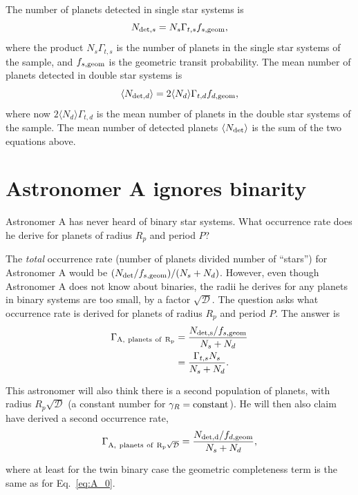 \documentclass{emulateapj}
\begin{document}
The number of planets detected in single star systems is
\begin{equation}
N_{{\rm det},s} = N_s \Gamma_{t,s} f_{s,{\rm geom}},
\label{eq:N_det_s}
\end{equation}
where the product $N_s \Gamma_{t,s}$ is the number of planets in the single 
star systems of the sample, and $f_{s,{\rm geom}}$ is the geometric transit 
probability.
The mean number of planets detected in double star systems is
\begin{equation}
\langle N_{{\rm det},d}\rangle = 2 \langle N_d\rangle  \Gamma_{t,d} f_{d,{\rm geom}},
\label{eq:N_det_d}
\end{equation}
where now $2 \langle N_d\rangle  \Gamma_{t,d}$ is the mean number of planets in
the double star systems of the sample.
The mean number of detected planets $\langle N_{\rm det} \rangle$ is the sum of
the two equations above.


\section{Astronomer A ignores binarity}
Astronomer A has never heard of binary star systems. What occurrence rate does 
he derive for planets of radius $R_p$ and period $P$?

The {\it total} occurrence rate (number of planets divided number of 
``stars'') for Astronomer A would be $(N_{\rm det}/f_{s,{\rm geom}})/(N_s + 
N_d)$. However, even though Astronomer A does not know about binaries, the 
radii he derives for any planets in binary systems are too small, by a factor 
$\sqrt{\mathcal{D}}$. The question asks what occurrence rate is derived for 
planets of radius $R_p$ and period $P$.
The answer is
\begin{align}
\Gamma_{\rm A,\ planets\ of\ R_p} &= \frac{N_{\rm det,s}/f_{s,{\rm geom}}}{N_s 
+ N_d}
\label{eq:A_0} \\
&= \frac{\Gamma_{t,s} N_s}{N_s + N_d}.
\end{align}

This astronomer will also think there is a second population of planets, with 
radius $R_p \sqrt{\mathcal{D}}$ (a constant number for $\gamma_R = {\rm 
constant}$). He will then also claim
have derived a second occurrence rate,
\begin{equation}
\Gamma_{\rm A,\ planets\ of\ R_p \sqrt{\mathcal{D}}} = \frac{N_{\rm 
det,d}/f_{d,{\rm geom}}}{N_s + N_d},
\end{equation}

where at least for the twin binary case the geometric completeness term is the 
same as for Eq.~\ref{eq:A_0}.
\end{document}
